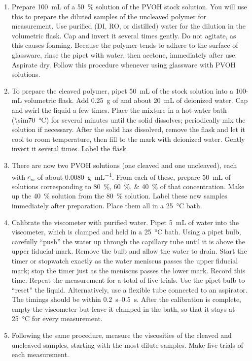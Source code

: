 \begin{enumerate}
	\item Prepare \qty{100}{\mL} of a \qty{50}{\percent} solution of the PVOH stock solution. 
	You will use this to prepare the diluted samples of the uncleaved polymer for measurement. 
	Use purified (DI, RO, or distilled) water for the dilution in the volumetric flask. 
	Cap and invert it several times gently. 
	Do not agitate, as this causes foaming. 
	Because the polymer tends to adhere to the surface of glassware, rinse the pipet with water, then acetone, immediately after use. 
	Aspirate dry. 
	Follow this procedure whenever using glassware with PVOH solutions.
	\item To prepare the cleaved polymer, pipet \qty{50}{\mL} of the stock solution into a 100-mL volumetric flask. 
	Add \qty{0.25}{\g} of  and about \qty{20}{\mL} of deionized water. 
	Cap and swirl the liquid a few times. 
	Place the mixture in a hot-water bath (\qty{\sim70}{\celsius}) for several minutes until the solid dissolves; periodically mix the solution if necessary. 
	After the solid has dissolved, remove the flask and let it cool to room temperature, then fill to the mark with deionized water. 
	Gently invert it several times. Label the flask.
	\item There are now two PVOH solutions (one cleaved and one uncleaved), each with \( c_m \) of about \qty{0.0080}{\g \per \mL}. 
	From each of these, prepare \qty{50}{\mL} of solutions corresponding to \SIlist{80;60;40}{\percent} of that concentration. 
	Make up the \qty{40}{\percent} solution from the \qty{80}{\percent} solution. 
	Label these new samples immediately after preparation. 
	Place them all in a \qty{25}{\celsius} bath.
	\item Calibrate the viscometer with purified water. 
	Pipet \qty{5}{\mL} of water into the viscometer, which is clamped and held in a \qty{25}{\celsius} bath. 
	Using a pipet bulb, carefully ``push'' the water up through the capillary tube until it is above the upper fiducial mark. 
	Remove the bulb and allow the water to drain. 
	Start the timer or stopwatch exactly as the water meniscus passes the upper fiducial mark; stop the timer just as the meniscus passes the lower mark. 
	Record this time. Repeat the measurement for a total of five trials. 
	Use the pipet bulb to ``reset'' the liquid. 
	Alternatively, use a flexible tube connected to an aspirator. 
	The timings should be within \qtyrange{0.2}{0.5}{\s}. 
	After the calibration is complete, empty the viscometer but leave it clamped in the bath, so that it stays at \qty{25}{\celsius} for every measurement.
	\item Following the same procedure, measure the viscosities of the cleaved and uncleaved samples, starting with the most dilute samples. 
	Make five trials of each measurement.
\end{enumerate}

